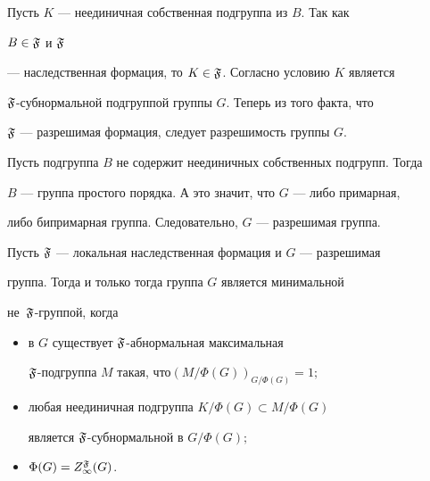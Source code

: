 \begin{pf}


Пусть $K$ --- неединичная собственная подгруппа из $B$. Так как


$B\in\frak F$ и $\frak F$


--- наследственная формация, то $K\in\frak F$. Согласно условию $K$ является


$\frak F$-субнормальной подгруппой группы $G$. Теперь из того факта, что


$\frak F$ --- разрешимая формация, следует разрешимость группы $G$.





Пусть подгруппа $B$ не содержит неединичных собственных подгрупп. Тогда


$B$ --- группа простого порядка. А это значит, что $G$ --- либо примарная,


либо бипримарная группа. Следовательно, $G$ --- разрешимая группа.


\end{pf}





\begin{thm}


Пусть $\frak F$ --- локальная наследственная формация и $G$ --- разрешимая


группа. Тогда и только тогда группа $G$ является минимальной


не~$\frak F$-группой, когда


\begin{itemize}


\item[1)] в $G$ существует $\frak F$-абнормальная максимальная


$\frak F$-подгруппа $M$ такая, что\linebreak $(M/\Phi(G))_{G/\Phi(G)}=1;$


\item[2)] любая неединичная подгруппа $K/\Phi(G)\subset M/\Phi(G)$


является $\frak F$-субнормальной в $G/\Phi(G);$


\item[3)] $\Phi(G)=Z^{\frak F}_\infty(G)$.


\end{itemize}


\end{thm}





